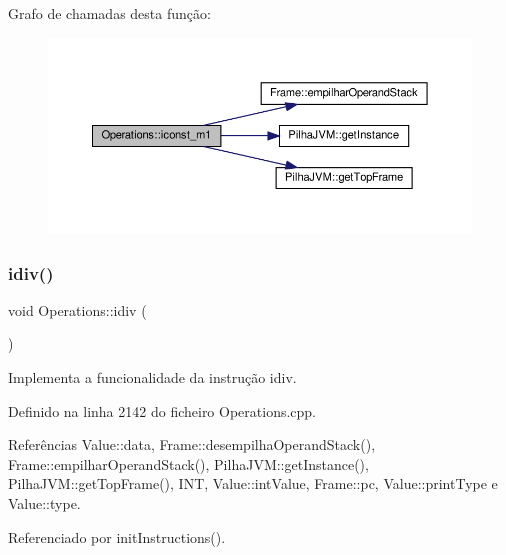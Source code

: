 Grafo de chamadas desta função\+:
\nopagebreak
\begin{figure}[H]
\begin{center}
\leavevmode
\includegraphics[width=350pt]{classOperations_abb57552d42047d4b685b2d68db6b1fd7_cgraph}
\end{center}
\end{figure}
\mbox{\label{classOperations_a5bf24c3cc02a8282c21a37cd7b7ba5d3}} 
\subsubsection{\texorpdfstring{idiv()}{idiv()}}
{\footnotesize\ttfamily void Operations\+::idiv (\begin{DoxyParamCaption}{ }\end{DoxyParamCaption})\hspace{0.3cm}{\ttfamily [private]}}



Implementa a funcionalidade da instrução idiv. 



Definido na linha 2142 do ficheiro Operations.\+cpp.



Referências Value\+::data, Frame\+::desempilha\+Operand\+Stack(), Frame\+::empilhar\+Operand\+Stack(), Pilha\+J\+V\+M\+::get\+Instance(), Pilha\+J\+V\+M\+::get\+Top\+Frame(), I\+NT, Value\+::int\+Value, Frame\+::pc, Value\+::print\+Type e Value\+::type.



Referenciado por init\+Instructions().

